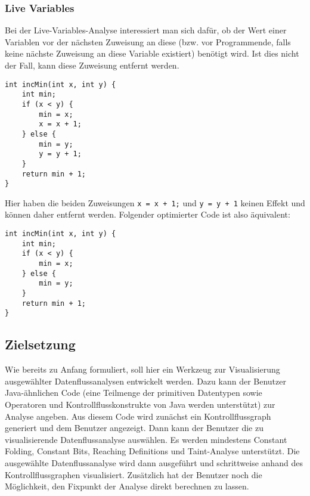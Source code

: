 \subsubsection{Live Variables}
Bei der Live-Variables-Analyse interessiert man sich dafür, ob der Wert einer Variablen vor der nächsten Zuweisung an diese (bzw. vor Programmende, falls keine nächste Zuweisung an diese Variable existiert) benötigt wird. 
Ist dies nicht der Fall, kann diese Zuweisung entfernt werden.

\par

\begin{lstlisting}[frame=single, captionpos=b, caption=Beispielcode für Live-Variables-Analyse]
int incMin(int x, int y) {
	int min;
	if (x < y) {
		min = x;
		x = x + 1;
	} else {
		min = y;
		y = y + 1;
	}
	return min + 1;
}
\end{lstlisting}

\par

Hier haben die beiden Zuweisungen \lstinline{x = x + 1;} und \lstinline{y = y + 1} keinen Effekt und können daher entfernt werden.
Folgender optimierter Code ist also äquivalent:

\par

\begin{lstlisting}[frame=single, captionpos=b, caption=Mittels Live-Variables-Analyse optimierte Version von Listing 7]
int incMin(int x, int y) {
	int min;
	if (x < y) {
		min = x;
	} else {
		min = y;
	}
	return min + 1;
}
\end{lstlisting}

\subsection{Zielsetzung}
Wie bereits zu Anfang formuliert, soll hier ein Werkzeug zur Visualisierung ausgewählter Datenflussanalysen entwickelt werden.
Dazu kann der Benutzer Java-ähnlichen Code (eine Teilmenge der primitiven Datentypen sowie Operatoren und Kontrollflusskonstrukte von Java werden unterstützt) zur Analyse angeben.
Aus diesem Code wird zunächst ein Kontrollflussgraph generiert und dem Benutzer angezeigt.
Dann kann der Benutzer die zu visualisierende Datenflussanalyse auswählen.
Es werden mindestens Constant Folding, Constant Bits, Reaching Definitions und Taint-Analyse unterstützt.
Die ausgewählte Datenflussanalyse wird dann ausgeführt und schrittweise anhand des Kontrollflussgraphen visualisiert.
Zusätzlich hat der Benutzer noch die Möglichkeit, den Fixpunkt der Analyse direkt berechnen zu lassen.
